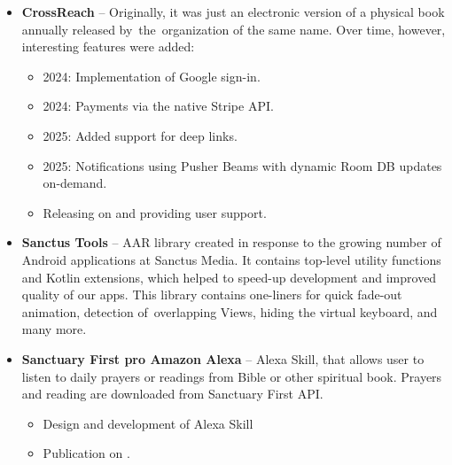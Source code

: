 \documentclass[11pt,a4paper,sans]{moderncv}
\begin{document}
{\begin{itemize}
\begin{itemize}
		\item 2023: Dynamic updates of likes, comments, and the start/end of live streams using the Pusher library.
		\item 2025: Major refactoring of core architecture; added Bible reader and playlists for guided meditations.
		\item Releasing on , providing user support and direct consultation with the client.
	\end{itemize}
	\item \textbf{CrossReach} -- Originally, it was just an electronic version of a physical book annually released by~the~organization of the same name. Over time, however, interesting features were added:
	\begin{itemize}
		\item 2024: Implementation of Google sign-in.
		\item 2024: Payments via the native Stripe API.
		\item 2025: Added support for deep links.
		\item 2025: Notifications using Pusher Beams with dynamic Room DB updates on-demand.
		\item Releasing on  and providing user support.
	\end{itemize}
	\item \textbf{Sanctus Tools} -- AAR library created in response to the growing number of Android applications at Sanctus Media. It contains top-level utility functions and Kotlin extensions, which helped to speed-up development and improved quality of our apps. This library contains one-liners for quick fade-out animation, detection of~overlapping Views, hiding the virtual keyboard, and many more.
	\item \textbf{Sanctuary First pro Amazon Alexa} -- Alexa Skill, that allows user to listen to daily prayers or readings from Bible or other spiritual book. Prayers and reading are downloaded from Sanctuary First API.
	\begin{itemize}
		\item Design and development of Alexa Skill
		\item Publication on .
	\end{itemize}
\end{itemize}
}
\end{document}
